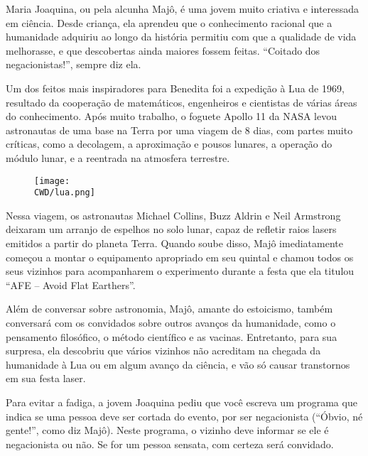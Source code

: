 %

Maria Joaquina, ou pela alcunha Majô, é uma jovem muito criativa e interessada em ciência. Desde criança, ela aprendeu que o conhecimento racional que a humanidade adquiriu ao longo da história permitiu com que a qualidade de vida melhorasse, e que descobertas ainda maiores fossem feitas. “Coitado dos negacionistas!”, sempre diz ela.

Um dos feitos mais inspiradores para Benedita foi a expedição à Lua de 1969, resultado da cooperação de matemáticos, engenheiros e cientistas de várias áreas do conhecimento. Após muito trabalho, o foguete Apollo 11 da NASA levou astronautas de uma base na Terra por uma viagem de 8 dias, com partes muito críticas, como a decolagem, a aproximação e pousos lunares, a operação do módulo lunar, e a reentrada na atmosfera terrestre.

\begin{figure}[!htb]
	\centering
	\texttt{[image: \\CWD/lua.png]}
\end{figure}

Nessa viagem, os astronautas Michael Collins, Buzz Aldrin e Neil Armstrong  deixaram um arranjo de espelhos no solo lunar, capaz de refletir raios lasers emitidos a partir do planeta Terra. Quando soube disso, Majô imediatamente começou a montar o equipamento apropriado em seu quintal e chamou todos os seus vizinhos para acompanharem o experimento durante a festa que ela titulou ``AFE – Avoid Flat Earthers''.

Além de conversar sobre astronomia, Majô, amante do estoicismo, também conversará com os convidados sobre outros avanços da humanidade, como o pensamento filosófico, o método científico e as vacinas. Entretanto, para sua surpresa, ela descobriu que vários vizinhos não acreditam na chegada da humanidade à Lua ou em algum avanço da ciência, e vão só causar transtornos em sua festa laser.

Para evitar a fadiga, a jovem Joaquina pediu que você escreva um programa que indica se uma pessoa deve ser cortada do evento, por ser negacionista (``Óbvio, né gente!'', como diz Majô). Neste programa, o vizinho deve informar se ele é negacionista ou não. Se for um pessoa sensata, com certeza será convidado.

